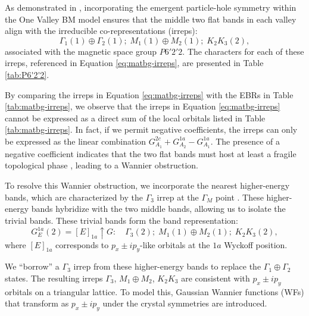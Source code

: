 \documentclass[12pt]{report}
\begin{document}
As demonstrated in \cite{all_magic_angles}, incorporating the emergent particle-hole symmetry within the One Valley BM model ensures that the middle two flat bands in each valley align with the irreducible co-representations (irreps):
\begin{equation} \label{eq:matbg-irreps}
\Gamma_1(1) \oplus \Gamma_2(1); \; M_1(1) \oplus M_2(1); \; K_2 K_3(2),
\end{equation}
associated with the magnetic space group \( P6'2'2 \). The characters for each of these irreps, referenced in Equation \ref{eq:matbg-irreps}, are presented in Table \ref{tab:P6'2'2}.


By comparing the irreps in Equation \ref{eq:matbg-irreps} with the EBRs in Table \ref{tab:matbg-irreps}, we observe that the irreps in Equation \ref{eq:matbg-irreps} cannot be expressed as a direct sum of the local orbitals listed in Table \ref{tab:matbg-irreps}. In fact, if we permit negative coefficients, the irreps can only be expressed as the linear combination \( G_{A_1}^{2c} + G_{A_2}^{1a} - G_{A_1}^{1a} \). The presence of a negative coefficient indicates that the two flat bands must host at least a fragile topological phase \cite{FragileTopology_Po2018}, leading to a Wannier obstruction.

To resolve this Wannier obstruction, we incorporate the nearest higher-energy bands, which are characterized by the \(\Gamma_3\) irrep at the \(\Gamma_M\) point \cite{topoheavyfermion2022}. These higher-energy bands hybridize with the two middle bands, allowing us to isolate the trivial bands. These trivial bands form the band representation:
\begin{equation} \label{eq:trivial-irreps}
G_E^{1a}(2) = [E]_{1a} \uparrow G: \quad \Gamma_3(2); \; M_1(1) \oplus M_2(1); \; K_2 K_3(2),
\end{equation}
where \([E]_{1a}\) corresponds to \(p_x \pm i p_y\)-like orbitals at the \(1a\) Wyckoff position.

We ``borrow'' a $\Gamma_3$ irrep from these higher-energy bands to replace the $\Gamma_1 \oplus \Gamma_2$ states. The resulting irreps $\Gamma_3$, $M_1 \oplus M_2$, $K_2 K_3$ are consistent with $p_x \pm i p_y$ orbitals on a triangular lattice. To model this, Gaussian Wannier functions (WFs) that transform as $p_x \pm i p_y$ under the crystal symmetries are introduced.
\end{document}
